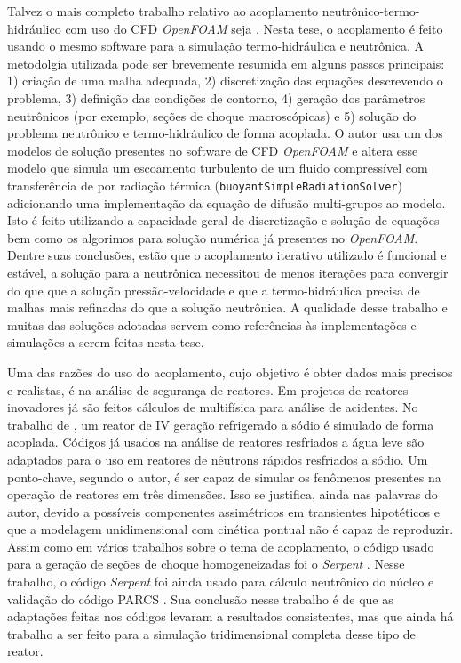 Talvez o mais completo trabalho relativo ao acoplamento neutrônico-termo-hidráulico com uso do 
CFD \textit{OpenFOAM} seja \cite{Jareteg2012}. Nesta tese, o acoplamento é feito usando o mesmo 
software para a simulação termo-hidráulica e neutrônica. A metodolgia utilizada pode ser brevemente 
resumida em alguns passos principais: 1) criação de uma malha adequada, 2) discretização das 
equações descrevendo o problema, 3) definição das condições de contorno, 4) geração dos 
parâmetros neutrônicos (por exemplo, seções de choque macroscópicas) e 5) solução do 
problema neutrônico e termo-hidráulico de forma acoplada. O autor usa um dos modelos de solução presentes no 
software de CFD \textit{OpenFOAM} \cite{OpenFOAM2013} e 
altera esse modelo que simula um escoamento turbulento de um fluido compressível com transferência de por radiação 
térmica (\texttt{buoyantSimpleRadiationSolver}) adicionando uma implementação da equação de difusão multi-grupos 
ao modelo. Isto é feito utilizando a capacidade geral de discretização e solução de equações bem como os algorimos 
para solução numérica já presentes no \textit{OpenFOAM}. Dentre suas conclusões, estão que o acoplamento iterativo 
utilizado é funcional e estável, a solução para a neutrônica necessitou de menos iterações para convergir 
do que que a solução pressão-velocidade e que a termo-hidráulica precisa de malhas mais refinadas do que a solução 
neutrônica. A qualidade desse trabalho e muitas das soluções adotadas servem como referências às implementações 
e simulações a serem feitas nesta tese.



Uma das razões do uso do acoplamento, cujo objetivo é obter dados mais precisos e realistas, é na 
análise de segurança de reatores. Em projetos de reatores inovadores já são feitos cálculos de multifísica para 
análise de acidentes. No trabalho de \cite{Lazaro2013}, um reator de IV geração refrigerado a sódio 
é simulado de forma acoplada. Códigos já usados na análise de reatores resfriados a água leve são adaptados 
para o uso em reatores de nêutrons rápidos resfriados a sódio. Um ponto-chave, segundo o autor, é ser capaz 
de simular os fenômenos presentes na operação de reatores em três dimensões. Isso se justifica, ainda nas 
palavras do autor, devido a possíveis componentes assimétricos em transientes hipotéticos e que 
a modelagem unidimensional com cinética pontual não é capaz de reproduzir. Assim como em vários trabalhos 
sobre o tema de acoplamento, o código usado para a geração de seções de choque homogeneizadas 
foi o \textit{Serpent} \cite{Serpent2013}. Nesse trabalho, o código \textit{Serpent} foi ainda usado 
para cálculo neutrônico do núcleo e validação do código PARCS \cite{PARCS2006}. Sua conclusão nesse trabalho 
é de que as adaptações feitas nos códigos levaram a resultados consistentes, mas que ainda há trabalho 
a ser feito para a simulação tridimensional completa desse tipo de reator.

